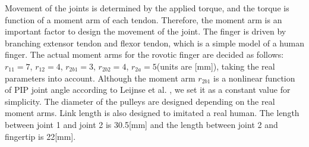\documentclass{llncs}
\begin{document}
Movement of the joints is determined by the applied torque, and the torque is function of a moment arm of each tendon.
Therefore, the moment arm is an important factor to design the movement of the joint.
The finger is driven by branching extensor tendon and flexor tendon, which is a simple model of a human finger.
The actual moment arms for the rovotic finger are decided as follows: $r_{11}=7$, $r_{12}=4$, $r_{2b1}=3$, $r_{2b2}=4$, $r_{2a}=5$(units are [mm]),
taking the real parameters into account\cite{Leijnse1995,Spoor1983}.
Although the moment arm $r_{2b1}$ is a nonlinear function of PIP joint angle according to Leijnse et al. \cite{Leijnse1995}, 
we set it as a constant value for simplicity.
The diameter of the pulleys are designed depending on the real moment arms.
Link length is also designed to imitated a real human.
The length between joint 1 and joint 2 is 30.5[mm] and the length between joint 2 and fingertip is 22[mm].
		
\end{document}
